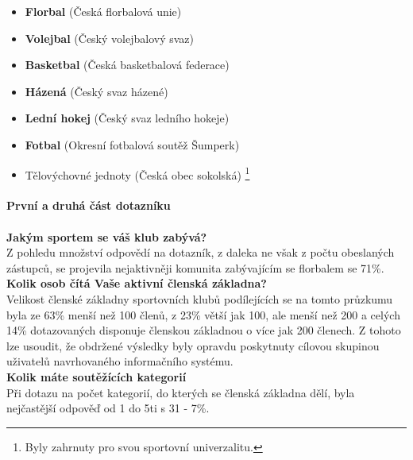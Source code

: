 \documentclass[11pt,oneside]{fithesis}
\begin{document}
                \begin{itemize}
                \item \textbf{Florbal} (Česká florbalová unie)
                \item \textbf{Volejbal} (Český volejbalový svaz)
                \item \textbf{Basketbal} (Česká basketbalová federace)
                \item \textbf{Házená} (Český svaz házené)
                \item \textbf{Lední hokej} (Český svaz ledního hokeje)
                \item \textbf{Fotbal} (Okresní fotbalová soutěž Šumperk)
                \item Tělovýchovné jednoty (Česká obec sokolská) \footnote{Byly zahrnuty pro svou sportovní univerzalitu.}
                \end{itemize}

                \paragraph*{První a druhá část dotazníku}

                \paragraph*{}

                \noindent
                \textbf{Jakým sportem se váš klub zabývá?}\\
                Z pohledu množství odpovědí na dotazník, z daleka ne však z počtu obeslaných zástupců, se projevila nejaktivněji komunita zabývajícím se florbalem se 71\%.\\

                \noindent
                \textbf{Kolik osob čítá Vaše aktivní členská základna?}\\
                Velikost členské základny sportovních klubů podílejících se na tomto průzkumu byla ze 63\% menší než 100 členů, z 23\% větší jak 100, ale menší než 200 a celých 14\% dotazovaných disponuje členskou základnou o více jak 200 členech. Z tohoto lze usoudit, že obdržené výsledky byly opravdu poskytnuty cílovou skupinou uživatelů navrhovaného informačního systému.\\

                \noindent
                \textbf{Kolik máte soutěžících kategorií}\\
                Při dotazu na počet kategorií, do kterých se členská základna dělí, byla nejčastější odpověď od 1 do 5ti s 31 - 7\%. \\
\end{document}
